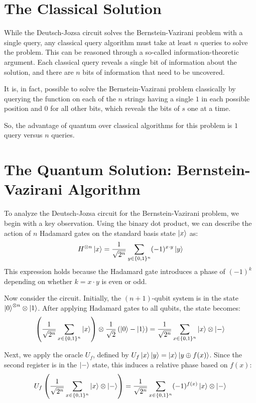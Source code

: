 \section{The Classical Solution}

While the Deutsch-Jozsa circuit solves the Bernstein-Vazirani problem with a single query, any classical query algorithm must take at least $n$ queries to solve the problem. This can be reasoned through a so-called information-theoretic argument. Each classical query reveals a single bit of information about the solution, and there are $n$ bits of information that need to be uncovered.

It is, in fact, possible to solve the Bernstein-Vazirani problem classically by querying the function on each of the $n$ strings having a single $1$ in each possible position and $0$ for all other bits, which reveals the bits of $s$ one at a time.

So, the advantage of quantum over classical algorithms for this problem is $1$ query versus $n$ queries.



\section{The Quantum Solution: Bernstein-Vazirani Algorithm}

To analyze the Deutsch-Jozsa circuit for the Bernstein-Vazirani problem, we begin with a key observation. Using the binary dot product, we can describe the action of $n$ Hadamard gates on the standard basis state $\ket{x}$ as:
\[
H^{\otimes n}\ket{x} = \frac{1}{\sqrt{2^n}} \sum_{y \in \{0,1\}^n} (-1)^{x \cdot y} \ket{y}
\]
This expression holds because the Hadamard gate introduces a phase of $(-1)^k$ depending on whether $k = x \cdot y$ is even or odd.

Now consider the circuit. Initially, the $(n+1)$-qubit system is in the state $\ket{0}^{\otimes n} \otimes \ket{1}$. After applying Hadamard gates to all qubits, the state becomes:
\[
\left( \frac{1}{\sqrt{2^n}} \sum_{x \in \{0,1\}^n} \ket{x} \right) \otimes \frac{1}{\sqrt{2}} \left( \ket{0} - \ket{1} \right) = \frac{1}{\sqrt{2^n}} \sum_{x \in \{0,1\}^n} \ket{x} \otimes \ket{-}
\]

Next, we apply the oracle $U_f$, defined by $U_f\ket{x}\ket{y} = \ket{x}\ket{y \oplus f(x)}$. Since the second register is in the $\ket{-}$ state, this induces a relative phase based on $f(x)$:
\[
U_f \left( \frac{1}{\sqrt{2^n}} \sum_{x \in \{0,1\}^n} \ket{x} \otimes \ket{-} \right) = \frac{1}{\sqrt{2^n}} \sum_{x \in \{0,1\}^n} (-1)^{f(x)} \ket{x} \otimes \ket{-}
\]


